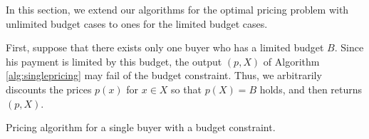 \documentclass[letterpaper]{article}
\newcommand{\OMIT}[1]{}
\theoremstyle{definition}
\begin{document}
In this section, we extend our algorithms for the optimal pricing problem with unlimited budget cases to ones for the limited budget cases. 


First, suppose that there exists only one buyer who has a limited budget $B$. 
Since his payment is limited by this budget, the output $(p, X)$ of Algorithm \ref{alg:singlepricing} may fail of the budget constraint. 
Thus, we arbitrarily discounts the prices $p(x)$ for $x \in X$ so that $p(X) = B$ holds, and then returns $(p, X)$. 

\OMIT{
\begin{algorithm}[tb]
\caption{Pricing algorithm for a single buyer with a budget constraint.}
\begin{algorithmic}
  \FOR{$s = 1, 2, \ldots, |V|$}
  \STATE{Let $X^s$ be the largest $s$ elements of $f(x)$}
  \STATE{Price $p^s(x) = f(X^s) - f(X^s \setminus x)$ for all $x \in X^s$ and $p^s(y) = +\infty$ for all $y \in V \setminus X^s$}
  \ENDFOR
  \STATE{Select $p$ and $X$ that attains maximum of $p^s(X^s)$}
  \IF{$p(X) > B$}
  \STATE{Discount $p(x)$ \ ($x \in X$) arbitrary to $p(X) = B$}
  \ENDIF
  \STATE{\textbf{Return $p$ and $X$}}
\end{algorithmic}
\end{algorithm}
}

\begin{algorithm}[tb]
\caption{Pricing algorithm for a single buyer with a budget constraint.}
\label{alg:singlebudget}
\begin{algorithmic}
\end{algorithmic}
\end{algorithm}
\end{document}
